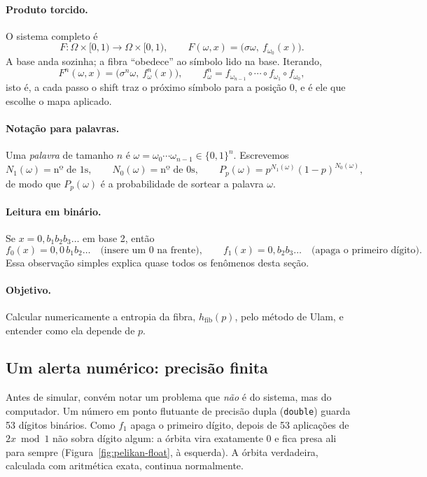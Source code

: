 \paragraph{Produto torcido.} O sistema completo é
\[
  F:\Omega\times[0,1)\to\Omega\times[0,1),\qquad
  F(\omega,x)=\big(\sigma\omega,\ f_{\omega_0}(x)\big).
\]
A base anda sozinha; a fibra ``obedece'' ao símbolo lido na base. Iterando,
\[
  F^n(\omega,x)=\big(\sigma^n\omega,\ f^n_\omega(x)\big),\qquad
  f^n_\omega=f_{\omega_{n-1}}\circ\cdots\circ f_{\omega_1}\circ f_{\omega_0},
\]
isto é, a cada passo o shift traz o próximo símbolo para a posição $0$, e é ele que escolhe
o mapa aplicado.

\paragraph{Notação para palavras.} Uma \emph{palavra} de tamanho $n$ é
$\omega=\omega_0\cdots\omega_{n-1}\in\{0,1\}^n$. Escrevemos
\[
  N_1(\omega)=\text{nº de 1s},\qquad N_0(\omega)=\text{nº de 0s},\qquad
  P_p(\omega)=p^{N_1(\omega)}(1-p)^{N_0(\omega)},
\]
de modo que $P_p(\omega)$ é a probabilidade de sortear a palavra $\omega$.

\paragraph{Leitura em binário.} Se $x=0{,}b_1b_2b_3\ldots$ em base 2, então
\[
  f_0(x)=0{,}0\,b_1b_2\ldots \quad\text{(insere um 0 na frente)},\qquad
  f_1(x)=0{,}b_2b_3\ldots \quad\text{(apaga o primeiro dígito)}.
\]
Essa observação simples explica quase todos os fenômenos desta seção.

\paragraph{Objetivo.} Calcular numericamente a entropia da fibra, $h_{\mathrm{fib}}(p)$,
pelo método de Ulam, e entender como ela depende de $p$.

\subsection{Um alerta numérico: precisão finita}
\label{subsec:pelikan-precisao}

Antes de simular, convém notar um problema que \emph{não} é do sistema, mas do computador.
Um número em ponto flutuante de precisão dupla (\texttt{double}) guarda 53 dígitos
binários. Como $f_1$ apaga o primeiro dígito, depois de 53 aplicações de $2x\bmod1$ não
sobra dígito algum: a órbita vira exatamente $0$ e fica presa ali para sempre
(Figura~\ref{fig:pelikan-float}, à esquerda). A órbita verdadeira, calculada com
aritmética exata, continua normalmente.


